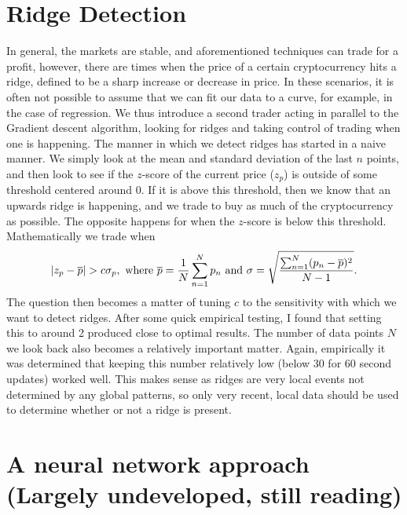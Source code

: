 \documentclass{article}
\DeclarePairedDelimiter\abs{\lvert}{\rvert}
\begin{document}
\section*{Ridge Detection}
In general, the markets are stable, and aforementioned techniques can trade for a profit, however, there are times when the price of a certain cryptocurrency hits a ridge, defined to be a sharp increase or decrease in price. In these scenarios, it is often not possible to assume that we can fit our data to a curve, for example, in the case of regression. We thus introduce a second trader acting in parallel to the Gradient descent algorithm, looking for ridges and taking control of trading when one is happening. The manner in which we detect ridges has started in a naive manner. We simply look at the mean and standard deviation of the last $n$ points, and then look to see if the $z$-score of the current price ($z_p$) is outside of some threshold centered around 0. If it is above this threshold, then we know that an upwards ridge is happening, and we trade to buy as much of the cryptocurrency as possible. The opposite happens for when the $z$-score is below this threshold. Mathematically we trade when
$$
\abs{z_p - \overline{p}} >  c\sigma_p, \text{ where } \overline{p} = \frac{1}{N}\sum_{n=1}^N p_n \text{ and } \sigma=\sqrt{\frac{\sum_{n=1}^N (p_n - \overline{p})^2}{N-1}}.
$$
The question then becomes a matter of tuning $c$ to the sensitivity with which we want to detect ridges. After some quick empirical testing, I found that setting this to around 2 produced close to optimal results. The number of data points $N$ we look back also becomes a relatively important matter. Again, empirically it was determined that keeping this number relatively low (below 30 for 60 second updates) worked well. This makes sense as ridges are very local events not determined by any global patterns, so only very recent, local data should be used to determine whether or not a ridge is present.


\section*{A neural network approach (Largely undeveloped, still reading)}
\end{document}
